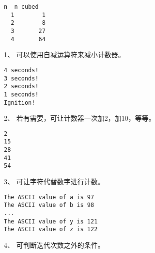 \begin{frame}[fragile]\ft{\secname}

\begin{lstlisting}[backgroundcolor=\color{red!10}]
  n  n cubed
  1        1
  2        8
  3       27
  4       64
\end{lstlisting}
\end{frame}

\begin{frame}[fragile]
1、 可以使用自减运算符来减小计数器。

\end{frame}

\begin{frame}[fragile]
\begin{lstlisting}[backgroundcolor=\color{red!10}]
4 seconds!
3 seconds!
2 seconds!
1 seconds!
Ignition!
\end{lstlisting}
\end{frame}

\begin{frame}[fragile]
2、 若有需要，可让计数器一次加2，加10，等等。

\end{frame}

\begin{frame}[fragile]

\begin{lstlisting}[backgroundcolor=\color{red!10}]
2
15
28
41
54
\end{lstlisting}
\end{frame}

\begin{frame}[fragile]
3、 可让字符代替数字进行计数。

\end{frame}

\begin{frame}[fragile]
\begin{lstlisting}[backgroundcolor=\color{red!10}]
The ASCII value of a is 97
The ASCII value of b is 98
... 
The ASCII value of y is 121
The ASCII value of z is 122
\end{lstlisting}
\end{frame}

\begin{frame}[fragile]
4、 可判断迭代次数之外的条件。

\end{frame}

